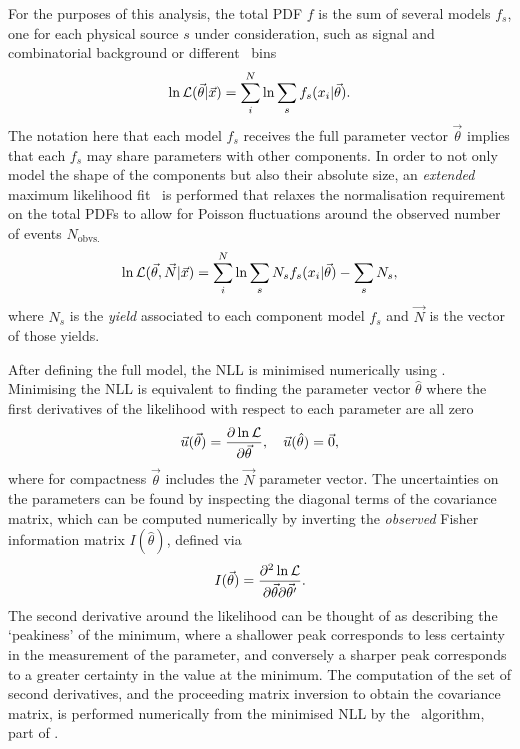 For the purposes of this analysis, the total \ac{PDF} $f$ is the sum of several 
models $f_{s}$, one for each physical source $s$ under consideration, such as 
signal and combinatorial background or different \pTy\ bins
\begin{equation}
  \ln{\ensuremath{\mathcal{L}}(\vec{\theta}|\vec{x})} =
  \sum_{i}^{N} \ln{\sum_{s} f_{s}(x_{i}|\vec{\theta})}.
\end{equation}
The notation here that each model $f_{s}$ receives the full parameter vector 
$\vec{\theta}$ implies that each $f_{s}$ may share parameters with other 
components.
In order to not only model the shape of the components but also their absolute 
size, an \emph{extended} maximum likelihood fit~\cite{Barlow:1990vc} is 
performed that relaxes the normalisation requirement on the total \acp{PDF} to 
allow for Poisson fluctuations around the observed number of events 
$N_{\text{obvs.}}$
\begin{equation}
  \ln{\ensuremath{\mathcal{L}}(\vec{\theta}, \vec{N}|\vec{x})} =
  \sum_{i}^{N}
    \ln{\sum_{s} N_{s}f_{s}(x_{i}|\vec{\theta})}
    - \sum_{s} N_{s}
  ,
\end{equation}
where $N_{s}$ is the \emph{yield} associated to each component model $f_{s}$ 
and $\vec{N}$ is the vector of those yields.

After defining the full model, the \acl{NLL} is minimised numerically using 
\minuit.
Minimising the \ac{NLL} is equivalent to finding the parameter vector 
$\hat{\theta}$ where the first derivatives of the likelihood with respect to 
each parameter are all zero
\begin{equation}
  \vec{u}(\vec{\theta}) = \frac{%
    \partial\ln{\likelihood}
  }{%
    \partial\vec{\theta}
  },\quad
  \vec{u}(\hat{\theta}) = \vec{0},
\end{equation}
where for compactness $\vec{\theta}$ includes the $\vec{N}$ parameter vector.
The uncertainties on the parameters can be found by inspecting the diagonal 
terms of the covariance matrix, which can be computed numerically by inverting 
the \emph{observed} Fisher information matrix $I(\hat{\theta})$, defined via
\begin{equation}
  I(\vec{\theta}) = \frac{%
    \partial^{2}\ln{\likelihood}
  }{%
    \partial\vec{\theta}\partial\vec{\theta}'
  }.
\end{equation}
The second derivative around the likelihood can be thought of as describing the 
`peakiness' of the minimum, where a shallower peak corresponds to less 
certainty in the measurement of the parameter, and conversely a sharper peak 
corresponds to a greater certainty in the value at the minimum.
The computation of the set of second derivatives, and the proceeding matrix 
inversion to obtain the covariance matrix, is performed numerically from the 
minimised \ac{NLL} by the \hesse\ algorithm, part of \minuit.

